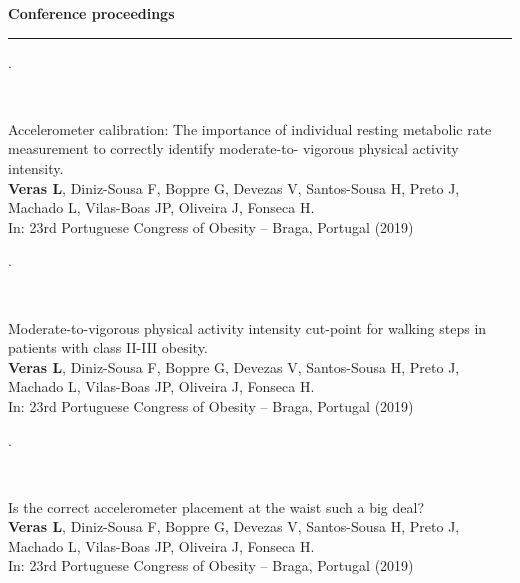 \documentclass[10t]{article}
\begin{document}
\noindent
\textbf{Conference proceedings} \rule{12.5cm}{0.8pt}

\vspace{1em}

\noindent
\begin{minipage}[t]{0.15\linewidth}
	.
\end{minipage}
\
\begin{minipage}[t]{0.85\linewidth}
\begin{minipage}[t]{\columnwidth}
	Accelerometer calibration: The importance of individual resting metabolic rate measurement to correctly identify moderate-to- vigorous physical activity intensity. \\
	\textbf{Veras L}, Diniz-Sousa F, Boppre G, Devezas V, Santos-Sousa H, Preto J, Machado L, Vilas-Boas JP, Oliveira J, Fonseca H.  \\
	In: 23rd Portuguese Congress of Obesity – Braga, Portugal (2019)
\end{minipage}
\end{minipage}

\vspace{0.5em}

\noindent
\begin{minipage}[t]{0.15\linewidth}
	.
\end{minipage}
\
\begin{minipage}[t]{0.85\linewidth}
\begin{minipage}[t]{\columnwidth}
	Moderate-to-vigorous physical activity intensity cut-point for walking steps in patients with class II-III obesity. \\
	\textbf{Veras L}, Diniz-Sousa F, Boppre G, Devezas V, Santos-Sousa H, Preto J, Machado L, Vilas-Boas JP, Oliveira J, Fonseca H.  \\
	In: 23rd Portuguese Congress of Obesity – Braga, Portugal (2019)
\end{minipage}
\end{minipage}

\vspace{0.5em}

\noindent
\begin{minipage}[t]{0.15\linewidth}
	.
\end{minipage}
\
\begin{minipage}[t]{0.85\linewidth}
\begin{minipage}[t]{\columnwidth}
	Is the correct accelerometer placement at the waist such a big deal? \\
	\textbf{Veras L}, Diniz-Sousa F, Boppre G, Devezas V, Santos-Sousa H, Preto J, Machado L, Vilas-Boas JP, Oliveira J, Fonseca H. \\
	In: 23rd Portuguese Congress of Obesity – Braga, Portugal (2019)
\end{minipage}
\end{minipage}
\end{document}
